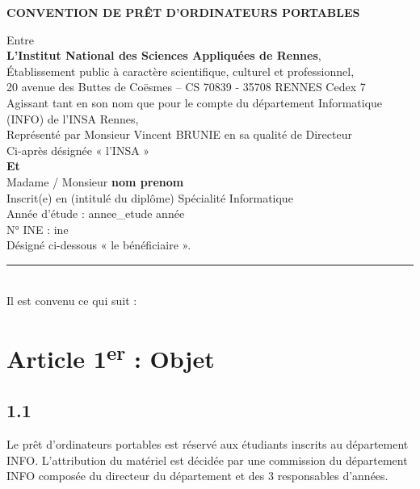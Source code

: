 \documentclass[12pt,a4paper]{article}
\begin{document}
\begin{center}
    \Large \textbf{CONVENTION DE PRÊT D'ORDINATEURS PORTABLES}
\end{center}

\vspace{1cm}

Entre \\
\textbf{L’Institut National des Sciences Appliquées de Rennes},\\
Établissement public à caractère scientifique, culturel et professionnel, \\
20 avenue des Buttes de Coësmes -- CS 70839 - 35708 RENNES Cedex 7 \\

Agissant tant en son nom que pour le compte du département Informatique (INFO) de l’INSA Rennes, \\

Représenté par Monsieur Vincent BRUNIE en sa qualité de Directeur \\

Ci-après désignée « l’INSA » \\

\textbf{Et} \\

Madame / Monsieur \textbf{ {{ nom }} {{ prenom }} } \\
Inscrit(e) en (intitulé du diplôme) Spécialité Informatique \\
Année d’étude : {{ annee_etude }} année\\
N° INE : {{ ine }} \\

Désigné ci-dessous « le bénéficiaire ». \\

\rule{\linewidth}{1pt} \\

Il est convenu ce qui suit :

\section*{Article 1\textsuperscript{er} : Objet}

\subsection*{1.1}
Le prêt d'ordinateurs portables est réservé aux étudiants inscrits au département INFO.  
L'attribution du matériel est décidée par une commission du département INFO composée du directeur du département et des 3 responsables d'années.
\end{document}
